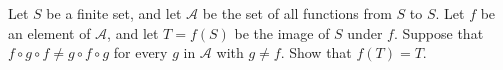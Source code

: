 Let $S$ be a finite set, and let $\mathcal{A}$ be the set of all functions from $S$ to $S$. Let $f$ be an element of $\mathcal{A}$, and let $T = f(S)$ be the image of $S$ under $f$. Suppose that $f \circ g \circ f \neq g \circ f \circ g$ for every $g$ in $\mathcal{A}$ with $g \neq f$. Show that $f(T) = T$.
